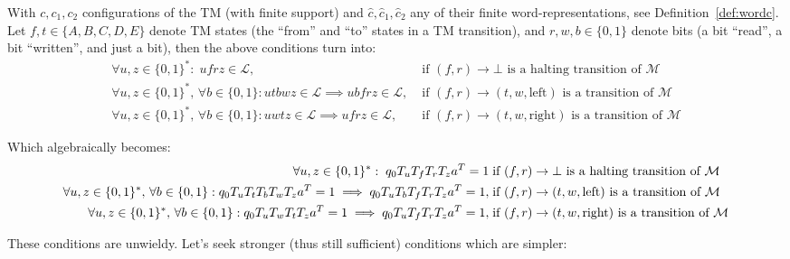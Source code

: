 With $c, c_1, c_2$ configurations of the TM (with finite support) and $\hat{c}, \hat{c}_1, \hat{c}_2$ any of their finite word-representations, see Definition~\ref{def:wordc}. Let $f,t \in \{A,B,C,D,E\}$ denote TM states (the ``from'' and ``to'' states in a TM transition), and $r,w,b \in \{0,1\}$ denote bits (a bit ``read'', a bit ``written'', and just a bit), then the above conditions turn into:
\begin{align*}
  \forall u,z\in\{0, 1\}^*: \; ufrz \in \mathcal{L},\;                                                           & \text{if $(f,r) \to \bot$ is a halting transition of $\mathcal{M}$}
  \\
  \forall u,z\in\{0, 1\}^*,\,\forall b \in \{0, 1\}: utbwz \in \mathcal{L} \implies ubfrz \in \mathcal{L},\;     & \text{if $(f,r) \to (t,w,\text{left})$ is a transition of $\mathcal{M}$}
  \\
  \forall u,z\in\{0, 1\}^*,\,\forall b \in \{0, 1\}: u w t z \in \mathcal{L} \implies u f r z \in \mathcal{L},\; & \text{if $(f,r) \to (t,w,\text{right})$ is a transition of $\mathcal{M}$}
\end{align*}

Which algebraically becomes:
\begin{align*}
  \forall u,z\in\{0, 1\}^*: \; q_0 T_u T_f T_r T_z a^T = 1 \;                                                                            & \text{if $(f,r) \to \bot$ is a halting transition of $\mathcal{M}$}
  \\
  \forall u,z\in\{0, 1\}^*,\,\forall b \in \{0, 1\}: q_0 T_{u} T_t T_b T_w T_{z} a^T = 1 \implies q_0 T_{u} T_b T_f T_r T_{z} a^T = 1,\; & \text{if $(f,r) \to (t,w,\text{left})$ is a transition of $\mathcal{M}$}
  \\
  \forall u,z\in\{0, 1\}^*,\,\forall b \in \{0, 1\}: q_0 T_{u} T_w T_t T_{z} a^T = 1 \implies q_0 T_{u} T_f T_r T_{z} a^T = 1,\;         & \text{if $(f,r) \to (t,w,\text{right})$ is a transition of $\mathcal{M}$}
\end{align*}

These conditions are unwieldy. Let's seek stronger (thus still sufficient) conditions which are simpler:

